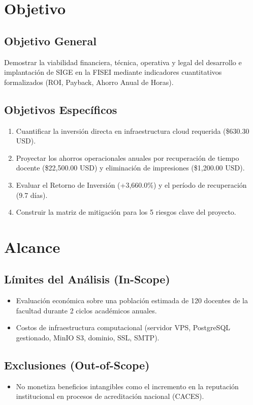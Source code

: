 \documentclass[12pt,a4paper]{article}
\begin{document}
\section{Objetivo}

\subsection{Objetivo General}
Demostrar la viabilidad financiera, técnica, operativa y legal del desarrollo e implantación de SIGE en la FISEI mediante indicadores cuantitativos formalizados (ROI, Payback, Ahorro Anual de Horas).

\subsection{Objetivos Específicos}
\begin{enumerate}[leftmargin=1.5em, itemsep=2pt, topsep=2pt]
    \item Cuantificar la inversión directa en infraestructura cloud requerida (\$630.30 USD).
    \item Proyectar los ahorros operacionales anuales por recuperación de tiempo docente (\$22,500.00 USD) y eliminación de impresiones (\$1,200.00 USD).
    \item Evaluar el Retorno de Inversión (+3,660.0\%) y el período de recuperación (9.7 días).
    \item Construir la matriz de mitigación para los 5 riesgos clave del proyecto.
\end{enumerate}

\section{Alcance}

\subsection{Límites del Análisis (In-Scope)}
\begin{itemize}[leftmargin=1.5em, itemsep=2pt]
    \item Evaluación económica sobre una población estimada de 120 docentes de la facultad durante 2 ciclos académicos anuales.
    \item Costos de infraestructura computacional (servidor VPS, PostgreSQL gestionado, MinIO S3, dominio, SSL, SMTP).
\end{itemize}

\subsection{Exclusiones (Out-of-Scope)}
\begin{itemize}[leftmargin=1.5em, itemsep=2pt]
    \item No monetiza beneficios intangibles como el incremento en la reputación institucional en procesos de acreditación nacional (CACES).
\end{itemize}
\end{document}
